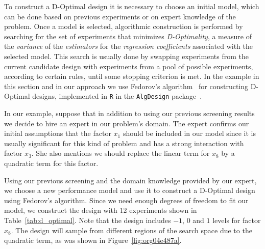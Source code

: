 \documentclass[conference]{IEEEtran}
\begin{document}
To construct a D-Optimal design it is necessary to choose an initial model,
which can be done based on previous experiments or on expert knowledge of the
problem. Once a model is selected, algorithmic construction is performed by
searching for the set of experiments that minimizes \emph{D-Optimality}, a measure of
the \emph{variance} of the \emph{estimators} for the \emph{regression coefficients} associated
with the selected model. This search is usually done by swapping experiments
from the current candidate design with experiments from a pool of possible
experiments, according to certain rules, until some stopping criterion is met.
In the example in this section and in our approach we use Fedorov's
algorithm~\cite{fedorov1972theory} for constructing D-Optimal designs,
implemented in \texttt{R} in the \texttt{AlgDesign} package~\cite{wheeler2014algdesign}.

In our example, suppose that in addition to using our previous screening results
we decide to hire an expert in our problem's domain. The expert confirms our
initial assumptions that the factor \(x_1\) should be included in our model since
it is usually significant for this kind of problem and has a strong interaction
with factor \(x_3\). She also mentions we should replace the linear term for \(x_8\)
by a quadratic term for this factor.

Using our previous screening and the domain knowledge provided by our expert, we
choose a new performance model and use it to construct a D-Optimal design using
Fedorov's algorithm. Since we need enough degrees of freedom to fit our model,
we construct the design with 12 experiments shown in Table~\ref{tab:d_optimal}.
Note that the design includes \(-1\), \(0\) and \(1\) levels for factor \(x_8\). The design
will sample from different regions of the search space due to the quadratic term,
as was shown in Figure~\ref{fig:org04e487a}.
\end{document}
